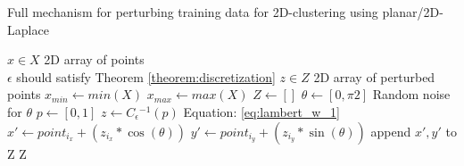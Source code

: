 \begin{algorithm}[H]
  \caption{Full mechanism for perturbing training data for 2D-clustering using planar/2D-Laplace \citep{DBLP:journals/corr/abs-1212-1984}}\label{alg:rq1}
  \begin{algorithmic}
    \Require $x \in X$  \Comment 2D array of points \\
    $\epsilon$ \Comment should satisfy Theorem \ref{theorem:discretization}
    \Ensure $z \in Z$ \Comment 2D array of perturbed points
    \State $x_{min} \gets min(X)$
    \State $x_{max} \gets max(X)$
    \State $Z \gets []$
    \State $\theta \gets [0, \pi2]$       \Comment Random noise for $\theta$
    \State $p \gets [0, 1]$
    \State $z \gets C{_\epsilon}{^{-1}}(p)$       \Comment Equation: \ref{eq:lambert_w_1}
    \State $x' \gets point_{i_x} + (z_{i_x} * \cos(\theta)) $ 
    \State $y' \gets point_{i_y} + (z_{i_y} * \sin(\theta)) $ 
    \State append $x', y'$ to Z
    \EndFor
    \State \Return Z
  \end{algorithmic}
  \label{alg:2d-laplace}
\end{algorithm}